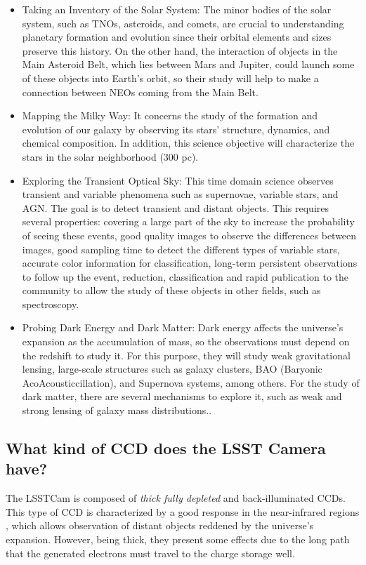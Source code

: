 \begin{itemize}
    \item Taking an Inventory of the Solar System: The minor bodies of the solar system, such as TNOs, asteroids, and comets, are crucial to understanding planetary formation and evolution since their orbital elements and sizes preserve this history. On the other hand, the interaction of objects in the Main Asteroid Belt, which lies between Mars and Jupiter, could launch some of these objects into Earth's orbit, so their study will help to make a connection between NEOs coming from the Main Belt. 
    
    \item Mapping the Milky Way: It concerns the study of the formation and evolution of our galaxy by observing its stars' structure, dynamics, and chemical composition. In addition, this science objective will characterize the stars in the solar neighborhood (300 pc).
    
    \item Exploring the Transient Optical Sky: This time domain science observes transient and variable phenomena such as supernovae, variable stars, and AGN. The goal is to detect transient and distant objects. This requires several properties: covering a large part of the sky to increase the probability of seeing these events, good quality images to observe the differences between images, good sampling time to detect the different types of variable stars, accurate color information for classification, long-term persistent observations to follow up the event, reduction, classification and rapid publication to the community to allow the study of these objects in other fields, such as spectroscopy. 
    
    \item Probing Dark Energy and Dark Matter: Dark energy affects the universe's expansion as the accumulation of mass, so the observations must depend on the redshift to study it. For this purpose, they will study weak gravitational lensing, large-scale structures such as galaxy clusters, BAO (Baryonic AcoAcousticcillation), and Supernova systems, among others. For the study of dark matter, there are several mechanisms to explore it, such as weak and strong lensing of galaxy mass distributions.. 
\end{itemize}

\subsection{What kind of CCD does the LSST Camera have?}
The LSSTCam is composed of \textit{thick fully depleted} and back-illuminated CCDs\citep{2009arXiv0912.0201L}. This type of CCD is characterized by a good response in the near-infrared regions \citep{lage2017measurements}, which allows observation of distant objects reddened by the universe's expansion. However, being thick, they present some effects due to the long path that the generated electrons must travel to the charge storage well. 

